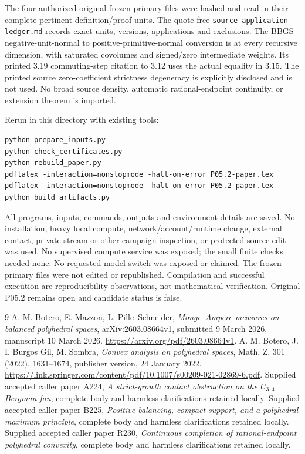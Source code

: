 \documentclass[11pt]{article}
\begin{document}
The four authorized original frozen primary files were hashed and read
in their complete pertinent definition/proof units. The quote-free
\texttt{source-application-ledger.md} records exact units, versions,
applications and exclusions. The BBGS negative-unit-normal to
positive-primitive-normal conversion is at every recursive dimension,
with saturated covolumes and signed/zero intermediate weights. Its
printed 3.19 commuting-step citation to 3.12 uses the actual equality in
3.15. The printed source zero-coefficient strictness degeneracy is
explicitly disclosed and is not used. No broad source density, automatic
rational-endpoint continuity, or extension theorem is imported.

Rerun in this directory with existing tools:
\begin{verbatim}
python prepare_inputs.py
python check_certificates.py
python rebuild_paper.py
pdflatex -interaction=nonstopmode -halt-on-error P05.2-paper.tex
pdflatex -interaction=nonstopmode -halt-on-error P05.2-paper.tex
python build_artifacts.py
\end{verbatim}
All programs, inputs, commands, outputs and environment details are saved.
No installation, heavy local compute, network/account/runtime change,
external contact, private stream or other campaign inspection, or
protected-source edit was used. No supervised compute service was exposed;
the small finite checks needed none. No requested model switch was exposed
or claimed. The frozen primary files were not edited or republished.
Compilation and successful execution are reproducibility observations,
not mathematical verification. Original P05.2 remains open and
candidate status is false.

\begin{thebibliography}{9}
 A. M. Botero, E. Mazzon, L. Pille--Schneider,
\emph{Monge--Ampere measures on balanced polyhedral spaces},
arXiv:2603.08664v1, submitted 9 March 2026, manuscript 10 March 2026.
\url{https://arxiv.org/pdf/2603.08664v1}.
 A. M. Botero, J. I. Burgos Gil, M. Sombra,
\emph{Convex analysis on polyhedral spaces}, Math. Z. 301 (2022),
1631--1674, publisher version, 24 January 2022.
\url{https://link.springer.com/content/pdf/10.1007/s00209-021-02869-6.pdf}.
 Supplied accepted caller paper A224,
\emph{A strict-growth contact obstruction on the \(U_{3,4}\) Bergman fan},
complete body and harmless clarifications retained locally.
 Supplied accepted caller paper B225,
\emph{Positive balancing, compact support, and a polyhedral maximum
principle}, complete body and harmless clarifications retained locally.
 Supplied accepted caller paper R230,
\emph{Continuous completion of rational-endpoint polyhedral convexity},
complete body and harmless clarifications retained locally.
\end{thebibliography}
\end{document}

